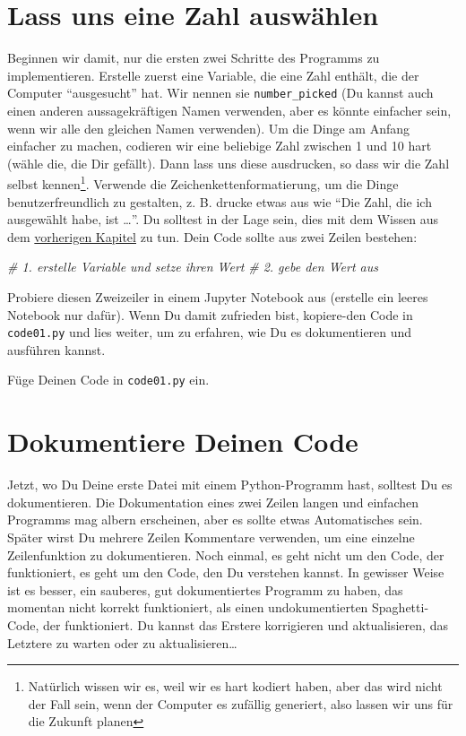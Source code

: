 \documentclass[
]{book}
\newenvironment{Shaded}{\begin{snugshade}}{\end{snugshade}}
\newcommand{\CommentTok}[1]{\textcolor[rgb]{0.56,0.35,0.01}{\textit{#1}}}
\begin{document}
\hypertarget{lass-uns-eine-zahl-auswuxe4hlen}{%
\section{Lass uns eine Zahl auswählen}\label{lass-uns-eine-zahl-auswuxe4hlen}}

Beginnen wir damit, nur die ersten zwei Schritte des Programms zu implementieren. Erstelle zuerst eine Variable, die eine Zahl enthält, die der Computer ``ausgesucht'' hat. Wir nennen sie \texttt{number\_picked} (Du kannst auch einen anderen aussagekräftigen Namen verwenden, aber es könnte einfacher sein, wenn wir alle den gleichen Namen verwenden). Um die Dinge am Anfang einfacher zu machen, codieren wir eine beliebige Zahl zwischen 1 und 10 hart (wähle die, die Dir gefällt). Dann lass uns diese ausdrucken, so dass wir die Zahl selbst kennen\footnote{Natürlich wissen wir es, weil wir es hart kodiert haben, aber das wird nicht der Fall sein, wenn der Computer es zufällig generiert, also lassen wir uns für die Zukunft planen}. Verwende die Zeichenkettenformatierung, um die Dinge benutzerfreundlich zu gestalten, z. B. drucke etwas aus wie ``Die Zahl, die ich ausgewählt habe, ist \ldots{}''. Du solltest in der Lage sein, dies mit dem Wissen aus dem \protect\hyperlink{string-formatting}{vorherigen Kapitel} zu tun. Dein Code sollte aus zwei Zeilen bestehen:

\begin{Shaded}
\begin{Highlighting}[]
\CommentTok{\# 1. erstelle Variable und setze ihren Wert}
\CommentTok{\# 2. gebe den Wert aus}
\end{Highlighting}
\end{Shaded}

Probiere diesen Zweizeiler in einem Jupyter Notebook aus (erstelle ein leeres Notebook nur dafür). Wenn Du damit zufrieden bist, kopiere-den Code in \texttt{code01.py} und lies weiter, um zu erfahren, wie Du es dokumentieren und ausführen kannst.

Füge Deinen Code in \texttt{code01.py} ein.

\hypertarget{dokumentiere-deinen-code-1}{%
\section{Dokumentiere Deinen Code}\label{dokumentiere-deinen-code-1}}

Jetzt, wo Du Deine erste Datei mit einem Python-Programm hast, solltest Du es dokumentieren. Die Dokumentation eines zwei Zeilen langen und einfachen Programms mag albern erscheinen, aber es sollte etwas Automatisches sein. Später wirst Du mehrere Zeilen Kommentare verwenden, um eine einzelne Zeilenfunktion zu dokumentieren. Noch einmal, es geht nicht um den Code, der funktioniert, es geht um den Code, den Du verstehen kannst. In gewisser Weise ist es besser, ein sauberes, gut dokumentiertes Programm zu haben, das momentan nicht korrekt funktioniert, als einen undokumentierten Spaghetti-Code, der funktioniert. Du kannst das Erstere korrigieren und aktualisieren, das Letztere zu warten oder zu aktualisieren\ldots{}
\end{document}
